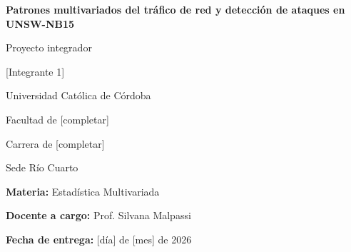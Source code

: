 \documentclass[11pt,a4paper]{article}
\newcommand{\titulo}{Patrones multivariados del tráfico de red y detección de ataques en UNSW-NB15}
\newcommand{\autores}{[Integrante 1]\par [Integrante 2]\par [Integrante 3]\par [Integrante 4]}
\newcommand{\afiliacion}{Universidad Católica de Córdoba\par Facultad de [completar]\par Carrera de [completar]\par Sede Río Cuarto}
\newcommand{\materia}{Estadística Multivariada}
\newcommand{\docente}{Prof. Silvana Malpassi}
\newcommand{\fechaentrega}{[día] de [mes] de 2026}
\begin{document}
\begingroup
  \thispagestyle{plain}
  \centering
  \vspace*{2.5cm}
  {\Large\bfseries \titulo \par}
  \vspace{1.2cm}
  {\large Proyecto integrador \par}
  \vspace{2cm}
  {\large \autores \par}
  \vspace{1.5cm}
  {\afiliacion \par}
  \vspace{1.5cm}
  {\textbf{Materia:} \materia \par}
  {\textbf{Docente a cargo:} \docente \par}
  \vspace{1.5cm}
  {\textbf{Fecha de entrega:} \fechaentrega \par}
  \vfill
\endgroup
\clearpage

\begin{singlespace}
\tableofcontents
\clearpage
\listoffigures
\vspace{1cm}
\listoftables
\end{singlespace}
\clearpage

\label{inicio-cuerpo}








\label{fin-cuerpo}

\clearpage
{}
{}
\renewcommand{\refname}{Referencias bibliográficas}



\clearpage
\appendix
\renewcommand{\thesection}{\Alph{section}}



\end{document}
